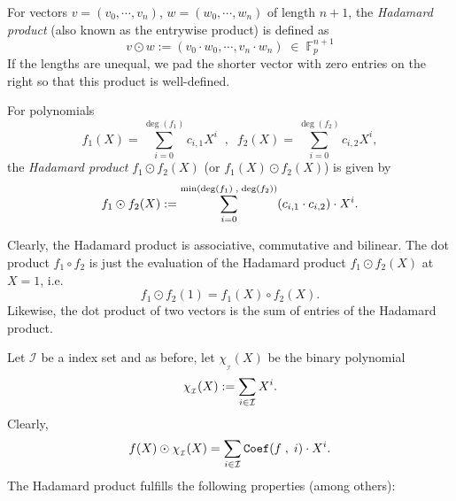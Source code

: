 \documentclass[11pt, lettersize, notitlepage, leqno, footskip=0.6cm]{article}
\newcommand{\bFp}{\mathbb{F}_p}
\newcommand{\mc}{\mathcal}
\newcommand{\mr}{\mathrm}
\newcommand{\vs}{\vspace{-0.15cm}}
\newcommand{\noin}{\noindent}
\numberwithin{equation}{section}
\begin{document}
For vectors $v = (v_0,\cdots,v_n)$, $w = (w_0,\cdots,w_n)$ of length $n+1$, the \textit{Hadamard product} (also known as the entrywise product) is defined as \vs $$ v\odot w:=  (v_0\cdot w_0,\cdots,v_n\cdot w_n)\;\in\; \bFp^{n+1}  $$ If the lengths are unequal, we pad the shorter vector with zero entries on the right so that this product is well-defined.

\begin{comment}

In this subsection, we provide a protocol that allows a Prover to show that the Hadamard product of two committed vectors/polynomials is the zero vector. Our primary use case for this protocol is the zero-knowledge batched membership proof. 


Clearly, the Hadamard product is zero if and only if for each index $i$, at least one of $v_i$ and $w_i$ is $0$. This, in turn is equivalent to the sum $\sum_{i=0}^n\gamma^i\cdot(v_i\cdot w_i) $ being $0$ for a randomly generated challenge $\gamma$. This happens to be the coefficient of $X^{\deg(f_2)}$ in the product $f_1(\gamma X)\cdot f_2^{\mr{Rev}}(X)$, where \vs $$ f_1(X) = \sum v_iX^i\;\;,\;\; f_2(X) = \sum w_iX^i $$ Thus, the Prover can combine the protocols $\hyperlink{Coef}{\tt{ZKPoCoef}}$, $\hyperlink{Prod}{\tt{ZKPoProd}}$,  $\hyperlink{Deg}{\tt{ZKPoDeg}}$, $\hyperlink{Const}{\tt{ZKPoConst}}$, $\hyperlink{Rev}{\tt{ZKPoRev}}$ to succinctly prove the statement.

\end{comment}


For polynomials \vs $$f_1(X) = \sum\limits_{i=0}^{\deg(f_1)} c_{i,1} X^i\;\;,\;\; f_2(X) = \sum\limits_{i=0}^{\deg(f_2)} c_{i,2} X^i, $$ the \textit{Hadamard product} $f_1\odot f_2(X)$ (or $f_1(X)\odot f_2(X)$) is given by \vs $$f_1\odot f_2(X) := \sum\limits_{i=0}^{\min(\deg(f_1)\;,\;\deg(f_2))} (c_{i,1}\cdot c_{i,2}) \cdot X^i .\vs $$

\noin Clearly, the Hadamard product is associative, commutative and bilinear. The dot product $f_1\circ f_2$ is just the evaluation of the Hadamard product $f_1\odot f_2(X)$ at $X=1$, i.e. $$ f_1\odot f_2(1) = f_1(X)\circ f_2(X). $$ Likewise, the dot product of two vectors is the sum of entries of the Hadamard product. \vspace{2mm}

Let $\mc{I}$ be a index set and as before, let $\chi_{_\mc{I}}(X)$ be the binary polynomial $$ \chi_{_\mc{I}}(X):= \sum\limits_{i\in \mc{I}} X^i. \vs $$ Clearly, $$ f(X)\odot \chi_{_\mc{I}}(X) = \sum\limits_{i\in \mc{I}} {\tt{Coef}}(f\;,\;i)\cdot X^i.  $$ The Hadamard product fulfills the following properties (among others): \vspace{2mm}
\end{document}
